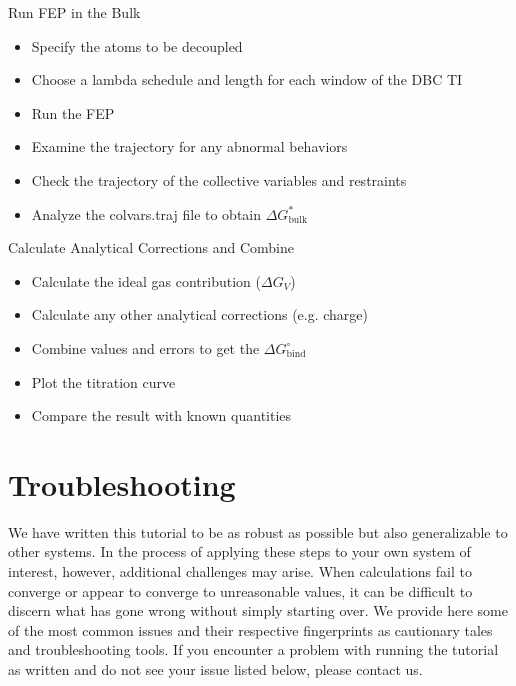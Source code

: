 \documentclass[9pt,tutorial]{Styling/livecoms}
\begin{document}
\begin{Checklists*}
\begin{checklist}{}\end{checklist}
\begin{checklist}{Run FEP in the Bulk}
\begin{itemize}
\item Specify the atoms to be decoupled
\item Choose a lambda schedule and length for each window of the DBC TI
\item Run the FEP
\item Examine the trajectory for any abnormal behaviors
\item Check the trajectory of the collective variables and restraints
\item Analyze the colvars.traj file to obtain $\Delta G^*_\mathrm{bulk}$
\end{itemize}
\end{checklist}

\begin{checklist}{Calculate Analytical Corrections and Combine}
\begin{itemize}
\item Calculate the ideal gas contribution ($\Delta G_V$)
\item Calculate any other analytical corrections (e.g. charge)
\item Combine values and errors to get the $\Delta G^\circ_\mathrm{bind}$
\item Plot the titration curve
\item Compare the result with known quantities
\end{itemize}
\end{checklist}

\end{Checklists*}

\twocolumn
\section{Troubleshooting}
\label{app:troubleshooting}
We have written this tutorial to be as robust as possible but also generalizable to other systems. 
In the process of applying these steps to your own system of interest, however, additional challenges may arise. 
When calculations fail to converge or appear to converge to unreasonable values, it can be difficult to discern what has gone wrong without simply starting over. 
We provide here some of the most common issues and their respective fingerprints as cautionary tales and troubleshooting tools. 
If you encounter a problem with running the tutorial as written and do not see your issue listed below, please contact us.
\end{document}
